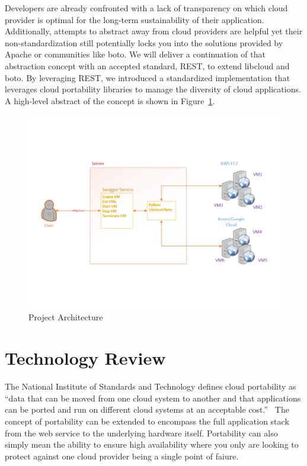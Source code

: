 Developers are already confronted with a lack of transparency on which cloud
provider is optimal for the long-term sustainability of their application.
Additionally, attempts to abstract away from cloud providers are helpful yet
their non-standardization still potentially locks you into the solutions
provided by Apache or communities like boto. We will deliver a continuation of
that abstraction concept with an accepted standard, REST, to extend libcloud
and
boto. By leveraging REST, we introduced a standardized implementation
that leverages cloud portability libraries to manage the diversity of cloud
applications. A high-level abstract of the concept is shown in
Figure~\ref{F:arch}.

\begin{figure}[!ht]
  \centering
  \includegraphics[width=\columnwidth]{images/proj-arch.pdf}
  \caption{Project Architecture}\label{F:arch}
\end{figure}

\section{Technology Review}

The National Institute of Standards and Technology defines cloud  portability
as
``data that can be moved from one cloud system to another and that 
applications
can be ported and run on different  cloud systems at an  acceptable
cost.''~\cite{hid-sp18-518-NIST-291} The concept of portability can be extended
to encompass the full application stack from the web service to the underlying
hardware itself. Portability can also simply mean the ability to ensure high
availability where you only are looking to protect against one cloud provider
being a single point of faiure.

